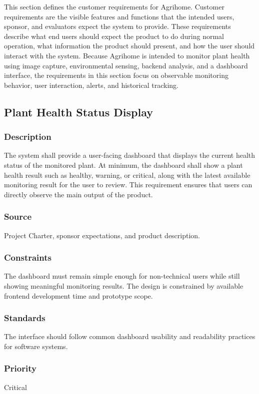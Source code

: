 This section defines the customer requirements for Agrihome. Customer requirements are the visible features and functions that the intended users, sponsor, and evaluators expect the system to provide. These requirements describe what end users should expect the product to do during normal operation, what information the product should present, and how the user should interact with the system. Because Agrihome is intended to monitor plant health using image capture, environmental sensing, backend analysis, and a dashboard interface, the requirements in this section focus on observable monitoring behavior, user interaction, alerts, and historical tracking.

\subsection{Plant Health Status Display}
\subsubsection{Description}
The system shall provide a user-facing dashboard that displays the current health status of the monitored plant. At minimum, the dashboard shall show a plant health result such as healthy, warning, or critical, along with the latest available monitoring result for the user to review. This requirement ensures that users can directly observe the main output of the product.

\subsubsection{Source}
Project Charter, sponsor expectations, and product description.

\subsubsection{Constraints}
The dashboard must remain simple enough for non-technical users while still showing meaningful monitoring results. The design is constrained by available frontend development time and prototype scope.

\subsubsection{Standards}
The interface should follow common dashboard usability and readability practices for software systems.

\subsubsection{Priority}
Critical

